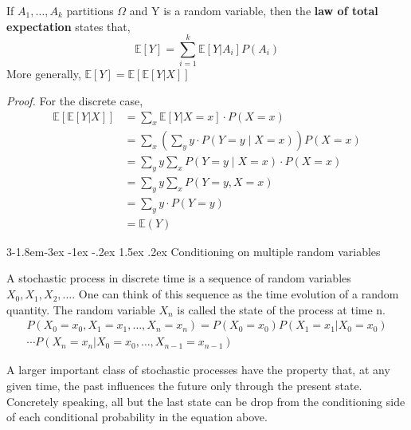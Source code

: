 \documentclass{tufte-handout}
\makeatletter
\renewcommand{\subsection}{\@startsection{subsection}%
    {3}{-1.8em}{-3ex \@plus -1ex \@minus -.2ex}%
    {1.5ex \@plus .2ex}
    {\hspace*{-5.5em}\fcolorbox{ltblue}{ltblue}{\parbox[c][1.0ex][b]{4em}{\phantom{space}}}
    \normalfont\large\itshape\color{ltblue}}}
\makeatother
\begin{document}
    \begin{Definition}
        If $ A_{1},\dots,A_{k } $ partitions $ \Omega $ and Y is a random variable, 
        then the \textbf{law of total expectation } states that,
        \[\mathbb{E }\left[ Y\right]= \sum_{i=1}^{k }\mathbb{E }[Y|A_{i }]P(A_{i})
        \]
        More generally, $\mathbb{E }\left[ Y\right]= \mathbb{E}[\mathbb{E }[Y|X]]  $
    \end{Definition}
    \textit{Proof.} For the discrete case,
    \begin{align*}
        \mathbb{E}[\mathbb{E }[Y|X]] &= \sum_{x}\mathbb{E }[Y|X=x ] \cdot P(X=x ) \\
        &= \sum_{x} \left( \sum_y y \cdot P(Y = y \mid X = x) \right)P(X=x )\\
        &= \sum_y y \sum_x P(Y = y \mid X = x)\cdot P(X=x )\\
        &=\sum_y y \sum_x P(Y = y , X = x)\\
        &= \sum_y y \cdot P(Y=y)\\
        &= \mathbb{E }(Y)
    \end{align*}


    \subsection{Conditioning on multiple random variables}
    
    A stochastic process in discrete time is a sequence of random variables $ X_0, X_1, X_2,\dots $.
    One can think of this sequence as the time evolution of a random quantity. The random variable $ X_n  $
    is called the state of the process at time n.\\

    
    \begin{align*}
        P(X_0=x_0, X_1=x_1,\dots,X_n=x_n)=P(X_0=x_0)P(X_1=x_1|X_0=x_0)\\
        \cdots P(X_n=x_n|X_0=x_0,\dots,X_{n-1}=x_{n-1})
    \end{align*}

    A larger important class of stochastic processes have the property that, at any given time, the past 
    influences the future only through the present state. Concretely speaking, all but the last state
    can be drop from the conditioning side of each conditional probability in the equation above. 
\end{document}
